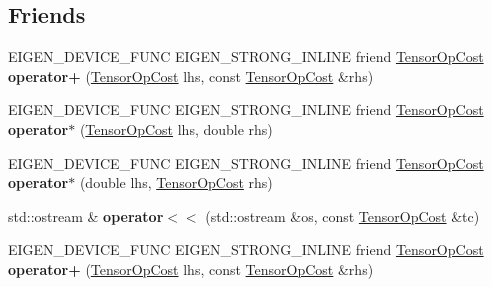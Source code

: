 \subsection*{Friends}
\begin{DoxyCompactItemize}
\item 
\mbox{\label{class_eigen_1_1_tensor_op_cost_a4bf19abdd278dc789984826418d45b4f}} 
E\+I\+G\+E\+N\+\_\+\+D\+E\+V\+I\+C\+E\+\_\+\+F\+U\+NC E\+I\+G\+E\+N\+\_\+\+S\+T\+R\+O\+N\+G\+\_\+\+I\+N\+L\+I\+NE friend \hyperlink{class_eigen_1_1_tensor_op_cost}{Tensor\+Op\+Cost} {\bfseries operator+} (\hyperlink{class_eigen_1_1_tensor_op_cost}{Tensor\+Op\+Cost} lhs, const \hyperlink{class_eigen_1_1_tensor_op_cost}{Tensor\+Op\+Cost} \&rhs)
\item 
\mbox{\label{class_eigen_1_1_tensor_op_cost_a7cf6f7f475447551927a5192c7d0e1d6}} 
E\+I\+G\+E\+N\+\_\+\+D\+E\+V\+I\+C\+E\+\_\+\+F\+U\+NC E\+I\+G\+E\+N\+\_\+\+S\+T\+R\+O\+N\+G\+\_\+\+I\+N\+L\+I\+NE friend \hyperlink{class_eigen_1_1_tensor_op_cost}{Tensor\+Op\+Cost} {\bfseries operator$\ast$} (\hyperlink{class_eigen_1_1_tensor_op_cost}{Tensor\+Op\+Cost} lhs, double rhs)
\item 
\mbox{\label{class_eigen_1_1_tensor_op_cost_a6557ef3f7399e2415a9602a088734438}} 
E\+I\+G\+E\+N\+\_\+\+D\+E\+V\+I\+C\+E\+\_\+\+F\+U\+NC E\+I\+G\+E\+N\+\_\+\+S\+T\+R\+O\+N\+G\+\_\+\+I\+N\+L\+I\+NE friend \hyperlink{class_eigen_1_1_tensor_op_cost}{Tensor\+Op\+Cost} {\bfseries operator$\ast$} (double lhs, \hyperlink{class_eigen_1_1_tensor_op_cost}{Tensor\+Op\+Cost} rhs)
\item 
\mbox{\label{class_eigen_1_1_tensor_op_cost_aad53c6427804f0add2236ccc87a697c8}} 
std\+::ostream \& {\bfseries operator$<$$<$} (std\+::ostream \&os, const \hyperlink{class_eigen_1_1_tensor_op_cost}{Tensor\+Op\+Cost} \&tc)
\item 
\mbox{\label{class_eigen_1_1_tensor_op_cost_a4bf19abdd278dc789984826418d45b4f}} 
E\+I\+G\+E\+N\+\_\+\+D\+E\+V\+I\+C\+E\+\_\+\+F\+U\+NC E\+I\+G\+E\+N\+\_\+\+S\+T\+R\+O\+N\+G\+\_\+\+I\+N\+L\+I\+NE friend \hyperlink{class_eigen_1_1_tensor_op_cost}{Tensor\+Op\+Cost} {\bfseries operator+} (\hyperlink{class_eigen_1_1_tensor_op_cost}{Tensor\+Op\+Cost} lhs, const \hyperlink{class_eigen_1_1_tensor_op_cost}{Tensor\+Op\+Cost} \&rhs)

\end{DoxyCompactItemize}
